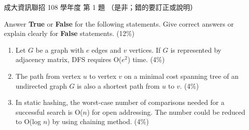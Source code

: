 \begin{pastexam}[label={px:ncku-108-prog-01}]{成大資訊聯招 108 學年度 第 1 題}
（是非；錯的要訂正或說明）

Answer \textbf{True} or \textbf{False} for the following statements. Give correct answers or explain
clearly for \textbf{False} statements. (12\%)
\begin{enumerate}[label=(\arabic*)]
\item Let $G$ be a graph with $e$ edges and $v$ vertices. If $G$ is represented by adjacency matrix,
DFS requires O($e^2$) time. (4\%)
\item The path from vertex $u$ to vertex $v$ on a minimal cost spanning tree of an undirected graph
$G$ is also a shortest path from $u$ to $v$. (4\%)
\item In static hashing, the worst-case number of comparisons needed for a successful search is
O($n$) for open addressing. The number could be reduced to O(log $n$) by using chaining method. (4\%)
\end{enumerate}
\end{pastexam}


